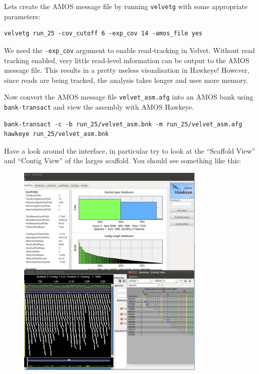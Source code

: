 \begin{steps}
Lets create the AMOS message file by running \texttt{velvetg} with some
appropriate parameters:
\begin{lstlisting}
velvetg run_25 -cov_cutoff 6 -exp_cov 14 -amos_file yes
\end{lstlisting}

\begin{note}
We need the \texttt{-exp\_cov} argument to enable read-tracking in Velvet.
Without read tracking enabled, very little read-level information can be output
to the AMOS message file. This results in a pretty useless visualisation in
Hawkeye! However, since reads are being tracked, the analysis takes longer and
uses more memory.
\end{note}

Now convert the AMOS message file \texttt{velvet\_asm.afg} into an AMOS bank
using \texttt{bank-transact} and view the assembly with AMOS Hawkeye.
\begin{lstlisting}
bank-transact -c -b run_25/velvet_asm.bnk -m run_25/velvet_asm.afg
hawkeye run_25/velvet_asm.bnk
\end{lstlisting}

Have a look around the interface, in particular try to look at the ``Scaffold
View'' and ``Contig View'' of the larges scaffold. You should see something like
this:

\begin{figure}[H]
\centering
\includegraphics[width=0.8\textwidth]{de_novo/velvet/hawkeye_single_ended.png}
\label{fig:hawkeye_single_ended}
\end{figure}

\end{steps}

